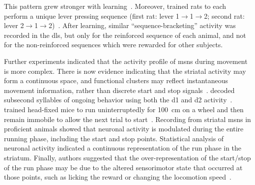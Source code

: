 This pattern grew stronger with learning~\cite{Jin2010N}.
Moreover,  trained rats to each perform a unique lever pressing sequence (first rat: lever 1$\rightarrow$1$\rightarrow$2; second rat: lever 2$\rightarrow$1$\rightarrow$2)~\cite{Martiros2018}.
After learning, similar ``sequence-bracketing'' activity was recorded in the \gls{dls}, but only for the reinforced sequence of each animal, and not for the non-reinforced sequences which were rewarded for other subjects.
\par
Further experiments indicated that the activity profile of \glspl{msn} during movement is more complex.
There is now evidence indicating that the striatal activity may form a continuous space, and functional clusters may reflect instantaneous movement information, rather than discrete start and stop signals~\cite{Sales-Carbonell2018, Markowitz2018Cell}.
 decoded subsecond syllables of ongoing behavior using both the \gls{d1} and \gls{d2} activity~\cite{Markowitz2018Cell}.
 trained head-fixed mice to run uninterruptedly for 100~cm on a wheel and then remain immobile to allow the next trial to start~\cite{Sales-Carbonell2018}.
Recording from striatal \glspl{msn} in proficient animals showed that neuronal activity is modulated during the entire running phase, including the start and stop points.
Statistical analysis of neuronal activity indicated a continuous representation of the run phase in the striatum.
Finally, authors suggested that the over-representation of the start/stop of the run phase may be due to the altered sensorimotor state that occurred at those points, such as licking the reward or changing the locomotion speed~\cite{Sales-Carbonell2018}.


